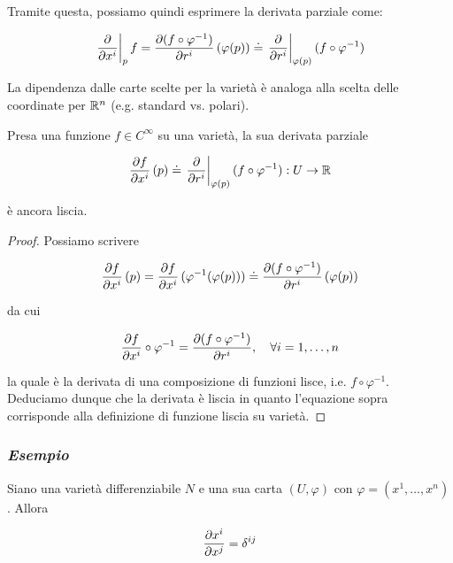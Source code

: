 Tramite questa, possiamo quindi esprimere la derivata parziale come:

\begin{equation}
	\eval{ \pdv{x^{i}} }_{p} f = \pdv{(f \circ \varphi^{-1})}{r^{i}} \, (\varphi(p)) %
	\doteq \eval{ \pdv{r^{i}} }_{\varphi(p)} (f \circ \varphi^{-1})
\end{equation}

La dipendenza dalle carte scelte per la varietà è analoga alla scelta delle coordinate per $ \mathbb{R}^{n} $ (e.g. standard vs. polari).

\begin{definition}
	Presa una funzione $ f \in C^{\infty} $ su una varietà, la sua derivata parziale
	
	\begin{equation}
		\pdv{f}{x^{i}} \, (p) \doteq \eval{ \pdv{r^{i}} }_{\varphi(p)} (f \circ \varphi^{-1}) : U \to \R
	\end{equation}

	è ancora liscia.
\end{definition}

\begin{proof}
	Possiamo scrivere
	
	\begin{equation}
		\pdv{f}{x^{i}} \, (p) = \pdv{f}{x^{i}} \, (\varphi^{-1}(\varphi(p))) %
		\doteq \pdv{(f \circ \varphi^{-1})}{r^{i}} \, (\varphi(p))
	\end{equation}

	da cui
	
	\begin{equation}
		\pdv{f}{x^{i}} \circ \varphi^{-1} = \pdv{(f \circ \varphi^{-1})}{r^{i}} \qcomma \forall i=1,\dots,n
	\end{equation}

	la quale è la derivata di una composizione di funzioni lisce, i.e. $ f \circ \varphi^{-1} $. Deduciamo dunque che la derivata è liscia in quanto l'equazione sopra corrisponde alla definizione di funzione liscia su varietà.
\end{proof}

\subsubsection{\textit{Esempio}}

Siano una varietà differenziabile $ N $ e una sua carta $ (U,\varphi) $ con $ \varphi = (x^{1},\dots,x^{n}) $. Allora

\begin{equation}
	\pdv{x^{i}}{x^{j}} = \delta^{ij}
\end{equation}


